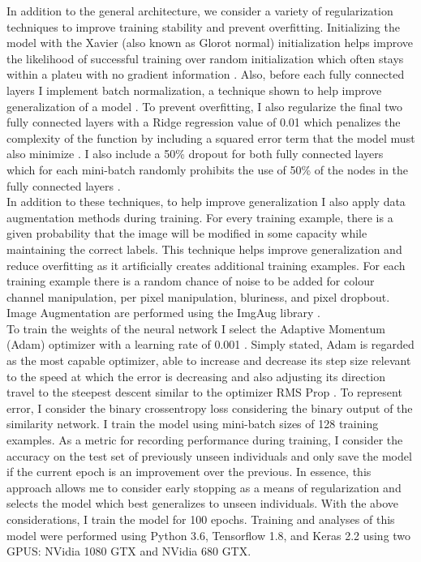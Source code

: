 \documentclass[11pt]{article}
\begin{document}
In addition to the general architecture, we consider a variety of regularization techniques to improve training stability and prevent overfitting. Initializing the model with the Xavier (also known as Glorot normal) initialization helps improve the likelihood of successful training over random initialization which often stays within a plateu with no gradient information \cite{glorot2010understanding}. Also, before each fully connected layers I implement batch normalization, a technique shown to help improve generalization of a model \cite{ioffe2015batch}. To prevent overfitting, I also regularize the final two fully connected layers with a Ridge regression value of 0.01 which penalizes the complexity of the function by including a squared error term that the model must also minimize \cite{hoerl1970ridge}. I also include a 50\% dropout for both fully connected layers which for each mini-batch randomly prohibits the use of 50\% of the nodes in the fully connected layers \cite{srivastava2014dropout}.
\newline
\\
In addition to these techniques, to help improve generalization I also apply data augmentation methods during training. For every training example, there is a given probability that the image will be modified in some capacity while maintaining the correct labels. This technique helps improve generalization and reduce overfitting as it artificially creates additional training examples. For each training example there is a random chance of noise to be added for colour channel manipulation, per pixel manipulation, bluriness, and pixel dropbout. Image Augmentation are performed using the ImgAug library \cite{imgaug}. 
\newline
\\
To train the weights of the neural network I select the Adaptive Momentum (Adam) optimizer with a learning rate of 0.001 \cite{kingma2014adam}. Simply stated, Adam is regarded as the most capable optimizer, able to increase and decrease its step size relevant to the speed at which the error is decreasing and also adjusting its direction travel to the steepest descent similar to the optimizer RMS Prop \cite{kingma2014adam}. To represent error, I consider the binary crossentropy loss considering the binary output of the similarity network. I train the model using mini-batch sizes of 128 training examples. As a metric for recording performance during training, I consider the accuracy on the test set of previously unseen individuals and only save the model if the current epoch is an improvement over the previous. In essence, this approach allows me to consider early stopping as a means of regularization and selects the model which best generalizes to unseen individuals. With the above considerations, I train the model for 100 epochs. Training and analyses of this model were performed using Python 3.6, Tensorflow 1.8, and Keras 2.2 using two GPUS: NVidia 1080 GTX and NVidia 680 GTX. 
\end{document}
